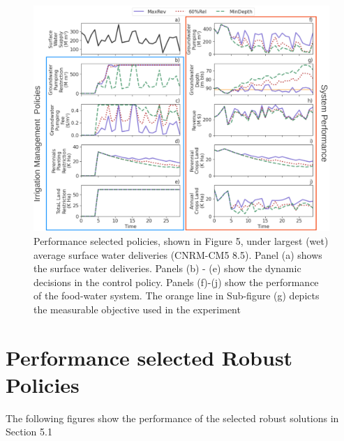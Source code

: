 \documentclass[11pt,a4paper]{article}
\begin{document}
\begin{figure}[H]
    \centering
    \includegraphics[width=1\textwidth]{./figs/selected_wet_performance.png}
    \caption{Performance selected policies, shown in Figure 5, under largest (wet) average surface water deliveries (CNRM-CM5 8.5). Panel (a) shows the surface water deliveries. Panels (b) - (e) show the dynamic decisions in the control policy. Panels (f)-(j) show the performance of the food-water system. The orange line in Sub-figure (g) depicts the measurable objective used in the experiment}
    \label{fig:m1esh1}
\end{figure}

\section{Performance selected Robust Policies}

The following figures show the performance of the selected robust solutions in Section 5.1
\end{document}
